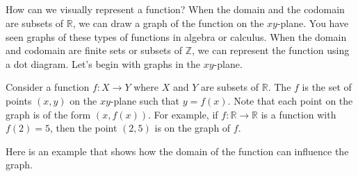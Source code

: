 \subsection{\subfndotgraphs}
\label{sub_fn_dot_graph}

How can we visually represent a function?  When the domain and the codomain are subsets of $\mathbb{R}$, we can draw a graph of the function on the $xy$-plane.  You have seen graphs of these types of functions in algebra or calculus. When the domain and codomain are finite sets or subsets of $\mathbb{Z}$, we can represent the function using a dot diagram.  Let's begin with graphs in the $xy$-plane.  

\begin{defn}
\label{defn_graph_function} 
    Consider a function $f: X \to Y$ where $X$ and $Y$ are subsets of $\mathbb{R}$.  The  $f$ is the set of points $(x,y)$ on the $xy$-plane such that $y=f(x)$. Note that each point on the graph is of the form $(x,f(x))$.  For example, if $f:\mathbb{R} \to \mathbb{R}$ is a function with $f(2)=5$, then the point $(2,5)$ is on the graph of $f$.
\end{defn}

Here is an example that shows how the domain of the function can influence the graph.

